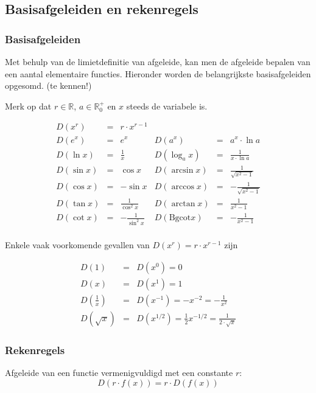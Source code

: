 \subsection{Basisafgeleiden en rekenregels}
\subsubsection{Basisafgeleiden}

Met behulp van de limietdefinitie van afgeleide, kan men de afgeleide bepalen van een aantal elementaire functies. Hieronder worden de belangrijkste basisafgeleiden opgesomd. (te kennen!)

Merk op dat $r \in \mathbb{R}$, $a \in \mathbb{R}^+_0$ en $x$ steeds de variabele is.

\begin{equation*}
\begin{array}{rclrcl}
D(x^r)&=&r\cdot x^{r-1} & & &  \\
D(e^x)&=&e^x& D(a^x)&=&a^x\cdot \ln a \\
D(\ln x)&=&\frac{1}{x}&D(\log_{a}x)&=&\frac{1}{x\cdot \ln a} \\
D(\sin x)&=&\cos x  & D(\arcsin x) &=& \frac{1}{\sqrt{x^2-1}} \\
D(\cos x)&=&-\sin x  & D(\arccos x) &=& -\frac{1}{\sqrt{x^2-1}} \\
D(\tan x)&=&\frac{1}{\cos^2 x} & D(\arctan x) &=& \frac{1}{x^2-1} \\
D(\cot x)&=&-\frac{1}{\sin^2 x} & D(\text{Bgcot} x) &=& -\frac{1}{x^2-1} \\
\end{array}
\end{equation*}

Enkele vaak voorkomende gevallen van $D(x^r)=r\cdot x^{r-1}$ zijn

\begin{eqnarray*}
D(1) &=& D(x^0) = 0 \\
D(x) &=& D(x^1) = 1 \\
D(\frac{1}{x})&=&D(x^{-1})=-x^{-2}=-\frac{1}{x^2}\\
D(\sqrt{x})&=&D(x^{1/2})=\frac{1}{2}x^{-1/2}=\frac{1}{2 \cdot \sqrt{x}}
\end{eqnarray*}

\subsubsection{Rekenregels}

\begin{ftrekenregel}
	Afgeleide van een functie vermenigvuldigd met een constante $r$:
	\begin{equation*}
	D(r \cdot f(x)) = r \cdot D(f(x))
	\end{equation*}
\end{ftrekenregel}

